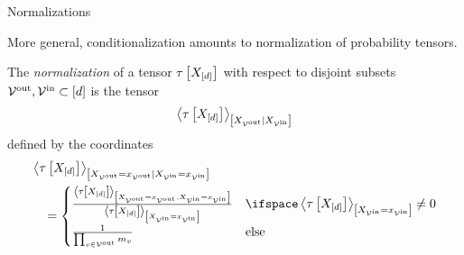 \documentclass{beamer}
\begin{document}
    \begin{frame}{Normalizations}

        More general, conditionalization amounts to normalization of probability tensors.

        \begin{definition}[Normalization]
            The \emph{normalization} of a tensor $\tau\left[X_{[d]}\right]$ with respect to disjoint subsets $\mathcal{V}^{\mathrm{out}},\mathcal{V}^{\mathrm{in}}\subset[d]$ is the tensor
            \begin{align*}
                \left\langle \tau\left[X_{[d]}\right]\right\rangle_{\left[ X_{\mathcal{V}^{\mathrm{out}}} | X_{\mathcal{V}^{\mathrm{in}}} \right]}
            \end{align*}
            defined by the coordinates
            \begin{align*}
                &\normalizationofwrt{\hypercorewith}{\indexedcatvariableof{\outnodes}}{\indexedcatvariableof{\innodes}} \\
                &\quad = \begin{cases}
                             \frac{
                                 \contractionof{\hypercorewith}{\indexedcatvariableof{\outnodes},\indexedcatvariableof{\innodes}}
                             }{
                                 \contractionof{\hypercorewith}{\indexedcatvariableof{\innodes}}
                             } & \ifspace \contractionof{\hypercorewith}{\indexedcatvariableof{\innodes}}\neq 0 \\
                             \frac{1}{\prod_{\node\in\outnodes}\catdimof{\node}} &  \text{else}
                \end{cases}
            \end{align*}
        \end{definition}

    \end{frame}
\end{document}
